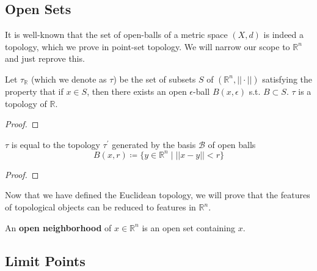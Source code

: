 \documentclass{article}
\begin{document}
  \subsection{Open Sets} 

    It is well-known that the set of open-balls of a metric space $(X, d)$ is indeed a topology, which we prove in point-set topology. We will narrow our scope to $\mathbb{R}^n$ and just reprove this.  

    \begin{theorem}
      Let $\tau_{\mathbb{R}}$ (which we denote as $\tau$) be the set of subsets $S$ of $(\mathbb{R}^n, || \cdot ||)$ satisfying the property that if $x \in S$, then there exists an open $\epsilon$-ball $B(x, \epsilon)$ s.t. $B \subset S$. $\tau$ is a topology of $\mathbb{R}$. 
    \end{theorem} 
    \begin{proof}
      
    \end{proof}

    \begin{theorem}
      $\tau$ is equal to the topology $\tau^\prime$ generated by the basis $\mathscr{B}$ of open balls 
      \begin{equation} 
        B(x, r) \coloneqq \{ y \in \mathbb{R}^n \mid ||x - y|| < r\}
      \end{equation}
    \end{theorem} 
    \begin{proof}
      
    \end{proof} 

    Now that we have defined the Euclidean topology, we will prove that the features of topological objects can be reduced to features in $\mathbb{R}^n$. 

    \begin{definition}
      An \textbf{open neighborhood} of $x \in \mathbb{R}^n$ is an open set containing $x$. 
    \end{definition}

    \begin{theorem}
      
    \end{theorem}

  \subsection{Limit Points} 
\end{document}
